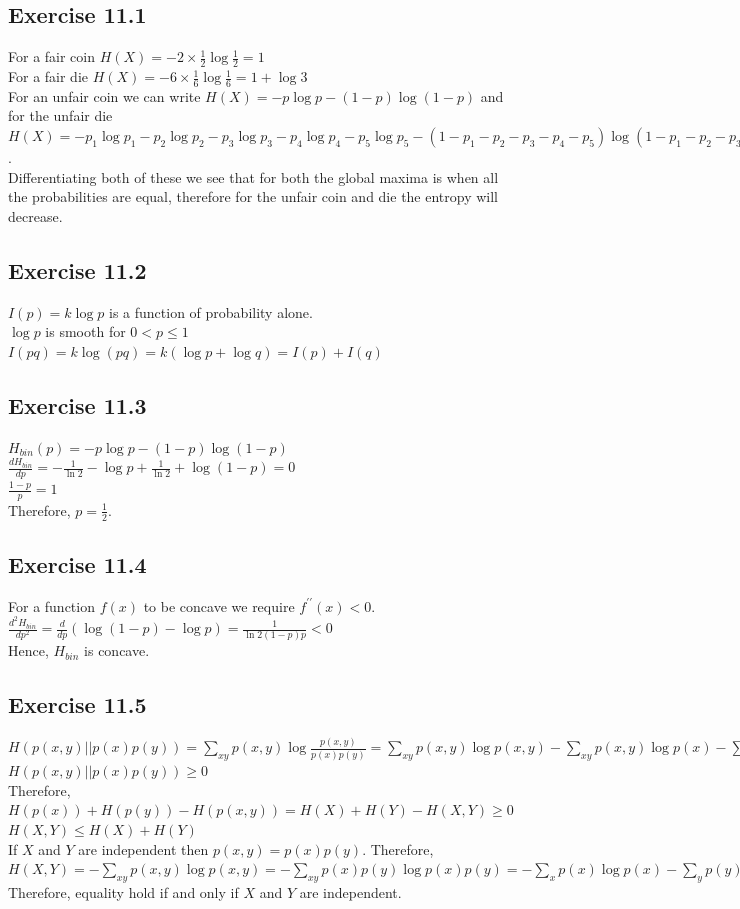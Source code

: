 \documentclass[a4paper,12pt]{article}
\begin{document}
\subsection*{Exercise 11.1}
For a fair coin $H(X)=-2\times\frac{1}{2}\log{\frac{1}{2}}=1$\\
For a fair die $H(X)=-6\times\frac{1}{6}\log{\frac{1}{6}}=1+\log{3}$\\
For an unfair coin we can write $H(X)=-p\log{p}-(1-p)\log{(1-p)}$ and 
for the unfair die $H(X)=-p_1\log{p_1}-p_2\log{p_2}-p_3\log{p_3}-p_4\log{p_4}-p_5\log{p_5}
-(1-p_1-p_2-p_3-p_4-p_5)\log{(1-p_1-p_2-p_3-p_4-p_5)}$.\\
Differentiating both of these we see that for both the global maxima is when 
all the probabilities are equal, therefore for the unfair coin and die the entropy will
decrease.
\subsection*{Exercise 11.2}
$I(p)=k\log{p}$ is a function of probability alone.\\
$\log{p}$ is smooth for $0<p\leq 1$\\
$I(pq)=k\log{(pq)}=k(\log{p}+\log{q})=I(p)+I(q)$
\subsection*{Exercise 11.3}
$H_{bin}(p)=-p\log{p}-(1-p)\log{(1-p)}$\\
$\displaystyle \frac{dH_{bin}}{dp}=-\frac{1}{\ln{2}}-\log{p}+\frac{1}{\ln{2}}+\log{(1-p)}=0$\\
$\displaystyle\frac{1-p}{p}=1$\\
Therefore, $p=\frac{1}{2}$.
\subsection*{Exercise 11.4}
For a function $f(x)$ to be concave we require $f^{\prime\prime}(x)<0$.\\
$\displaystyle \frac{d^2H_{bin}}{dp^2}=\frac{d}{dp}(\log{(1-p)}-\log{p})=
\frac{1}{\ln{2}(1-p)p}<0$\\
Hence, $H_{bin}$ is concave.
\subsection*{Exercise 11.5}
$H(p(x,y)||p(x)p(y))=\displaystyle\sum_{xy}p(x,y)\log{\frac{p(x,y)}{p(x)p(y)}}=
\sum_{xy}p(x,y)\log{p(x,y)}-\sum_{xy}p(x,y)\log{p(x)}-\sum_{xy}p(x,y)\log{p(y)}=
\sum_{xy}p(x,y)\log{p(x,y)}-\sum_{x}p(x)\log{p(x)}-\sum_{y}p(y)\log{p(y)}=
H(p(x))+H(p(y))-H(p(x,y))$\\
$H(p(x,y)||p(x)p(y))\geq 0$\\
Therefore,\\
$H(p(x))+H(p(y))-H(p(x,y))=H(X)+H(Y)-H(X,Y)\geq 0$\\
$H(X,Y)\leq H(X)+H(Y)$\\
If $X$ and $Y$ are independent then $p(x,y)=p(x)p(y)$. Therefore,\\
$H(X,Y)=-\displaystyle\sum_{xy}p(x,y)\log{p(x,y)}=
-\sum_{xy}p(x)p(y)\log{p(x)p(y)}=-\sum_{x}p(x)\log{p(x)}-\sum_{y}p(y)\log{p(y)}=H(X)+H(Y)$\\
Therefore, equality hold if and only if $X$ and $Y$ are independent.
\end{document}
